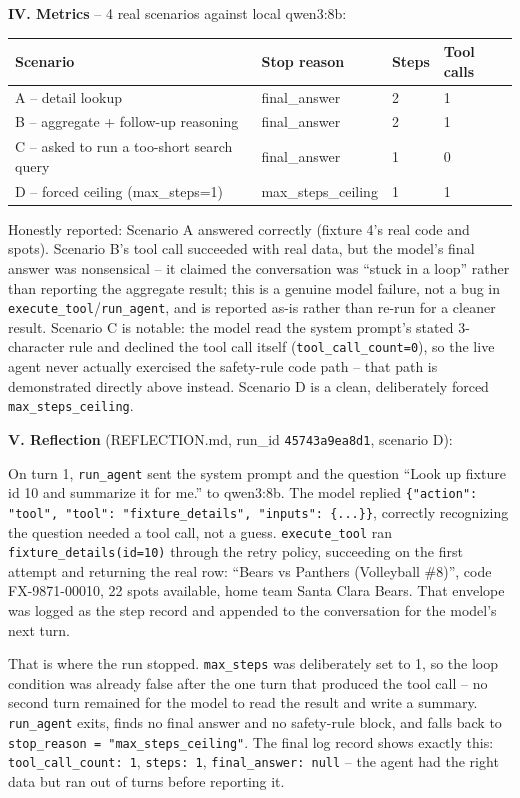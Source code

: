 \documentclass[11pt]{article}
\begin{document}
\textbf{IV. Metrics} -- 4 real scenarios against local qwen3:8b:

\begin{tabular}{|p{5.3cm}|l|l|l|}\hline
\textbf{Scenario} & \textbf{Stop reason} & \textbf{Steps} & \textbf{Tool calls} \\\hline
A -- detail lookup & final\_answer & 2 & 1 \\\hline
B -- aggregate + follow-up reasoning & final\_answer & 2 & 1 \\\hline
C -- asked to run a too-short search query & final\_answer & 1 & 0 \\\hline
D -- forced ceiling (max\_steps=1) & max\_steps\_ceiling & 1 & 1 \\\hline
\end{tabular}
\vspace{0.5em}

Honestly reported: Scenario A answered correctly (fixture 4's real code and
spots). Scenario B's tool call succeeded with real data, but the model's
final answer was nonsensical -- it claimed the conversation was ``stuck in
a loop'' rather than reporting the aggregate result; this is a genuine
model failure, not a bug in \verb|execute_tool|/\verb|run_agent|, and is
reported as-is rather than re-run for a cleaner result. Scenario C is
notable: the model read the system prompt's stated 3-character rule and
declined the tool call itself (\verb|tool_call_count=0|), so the live agent
never actually exercised the safety-rule code path -- that path is
demonstrated directly above instead. Scenario D is a clean, deliberately
forced \verb|max_steps_ceiling|.

\textbf{V. Reflection} (REFLECTION.md, run\_id \verb|45743a9ea8d1|, scenario
D):

On turn 1, \verb|run_agent| sent the system prompt and the question ``Look
up fixture id 10 and summarize it for me.'' to qwen3:8b. The model replied
\verb|{"action": "tool", "tool": "fixture_details", "inputs": {...}}|,
correctly recognizing the question needed a tool call, not a guess.
\verb|execute_tool| ran \verb|fixture_details(id=10)| through the retry
policy, succeeding on the first attempt and returning the real row:
``Bears vs Panthers (Volleyball \#8)'', code FX-9871-00010, 22 spots
available, home team Santa Clara Bears. That envelope was logged as the
step record and appended to the conversation for the model's next turn.

That is where the run stopped. \verb|max_steps| was deliberately set to 1,
so the loop condition was already false after the one turn that produced
the tool call -- no second turn remained for the model to read the result
and write a summary. \verb|run_agent| exits, finds no final answer and no
safety-rule block, and falls back to \verb|stop_reason = "max_steps_ceiling"|.
The final log record shows exactly this: \verb|tool_call_count: 1|,
\verb|steps: 1|, \verb|final_answer: null| -- the agent had the right data
but ran out of turns before reporting it.
\end{document}
